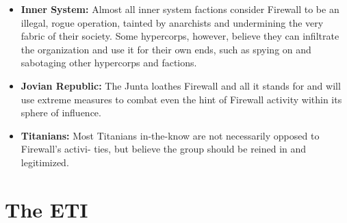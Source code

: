 \begin{itemize}
\item  \textbf{Inner System:} Almost all inner system factions consider Firewall to be an illegal, rogue operation, tainted by anarchists and undermining the very fabric of their society. Some hypercorps, however, believe they can infiltrate the organization and use it for their own ends, such as spying on and sabotaging other hypercorps and factions. 
\item  \textbf{Jovian Republic:} The Junta loathes Firewall and all it stands for and will use extreme measures to combat even the hint of Firewall activity within its sphere of influence.
\item  \textbf{Titanians:} Most Titanians in-the-know are not necessarily opposed to Firewall's activi- ties, but believe the group should be reined in and legitimized. 
\end{itemize}


\section{The ETI }

